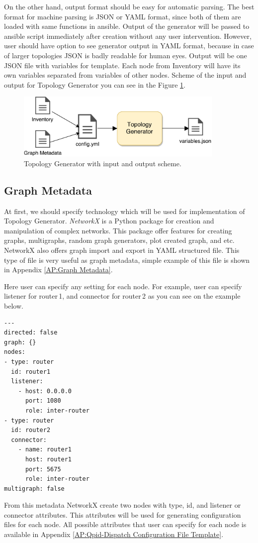 On the other hand, output format should be easy for automatic parsing. The best format for machine parsing is JSON or YAML format, since both of them are loaded with same functions in ansible. Output of the generator will be passed to ansible script immediately after creation without any user intervention. However, user should have option to see generator output in YAML format, because in case of larger topologies JSON is badly readable for human eyes. Output will be one JSON file with variables for template. Each node from Inventory will have its own variables separated from variables of other nodes. Scheme of the input and output for Topology Generator you can see in the Figure \ref{fig:generator}.

\begin{figure}[H]
  \centering
  \includegraphics[width=10cm]{obrazky-figures/generator.pdf}
  \caption{Topology Generator with input and output scheme.}
  \label{fig:generator}
\end{figure}


\subsection{Graph Metadata}
\label{Graph Metadata}
At first, we should specify technology which will be used for implementation of Topology Generator. \emph{NetworkX} is a Python package for creation and manipulation of complex networks. This package offer features for creating graphs, multigraphs, random graph generators, plot created graph, and etc. NetworkX also offers graph import and export in YAML structured file. This type of file is very useful as graph metadata, simple example of this file is shown in Appendix \ref{AP:Graph Metadata}.

Here user can specify any setting for each node. For example, user can specify listener for router\,1, and connector for router\,2 as you can see on the example below.

\begin{verbatim}
---
directed: false
graph: {}
nodes:
- type: router
  id: router1
  listener:
  	- host: 0.0.0.0
  	  port: 1080
  	  role: inter-router
- type: router
  id: router2
  connector:
  	- name: router1
  	  host: router1
  	  port: 5675
  	  role: inter-router
multigraph: false
\end{verbatim}
From this metadata NetworkX create two nodes with type, id, and listener or connector attributes. This attributes will be used for generating configuration files for each node. All possible attributes that user can specify for each node is available in Appendix \ref{AP:Qpid-Dispatch Configuration File Template}.

